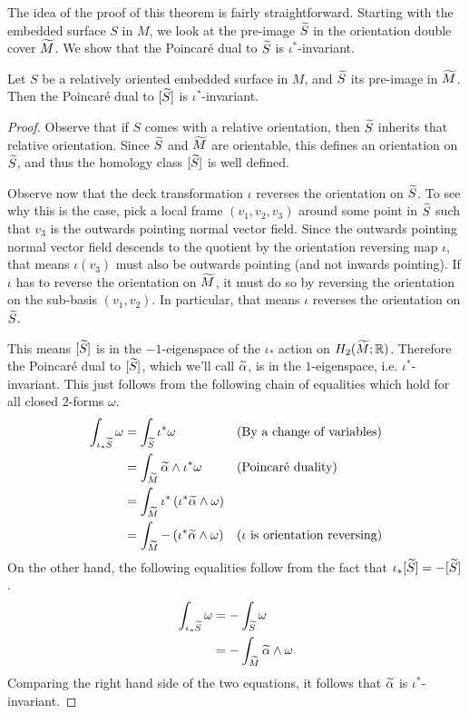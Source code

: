 The idea of the proof of this theorem is fairly straightforward. Starting with the embedded surface
$S$ in $M$, we look at the pre-image $\widetilde{S}$ in the orientation double cover $\widetilde{M}$. We show
that the Poincar\'e dual to $\widetilde{S}$ is $\iota^{\ast}$-invariant.
\begin{lem}
  \label{lem:PD1}
  Let $S$ be a relatively oriented embedded surface in $M$, and $\widetilde{S}$ its pre-image in
  $\widetilde{M}$. Then the Poincar\'e dual to $[\widetilde{S}]$ is $\iota^{\ast}$-invariant.
\end{lem}
\begin{proof}
  Observe that if $S$ comes with a relative orientation, then $\widetilde{S}$ inherits that relative
  orientation. Since $\widetilde{S}$ and $\widetilde{M}$ are orientable, this defines an orientation on $\widetilde{S}$,
  and thus the homology class $[\widetilde{S}]$ is well defined.

  Observe now that the deck transformation $\iota$ reverses the orientation on $\widetilde{S}$. To see why
  this is the case, pick a local frame $(v_1, v_2, v_3)$ around some point in $\widetilde{S}$ such that
  $v_3$ is the outwards pointing normal vector field. Since the outwards pointing normal vector
  field descends to the quotient by the orientation reversing map $\iota$, that means $\iota(v_3)$
  must also be outwards pointing (and not inwards pointing). If $\iota$ has to reverse the
  orientation on $\widetilde{M}$, it must do so by reversing the orientation on the sub-basis
  $(v_1, v_2)$. In particular, that means $\iota$ reverses the orientation on $\widetilde{S}$.

  This means $[\widetilde{S}]$ is in the $-1$-eigenspace of the $\iota_{\ast}$ action on
  $H_2(\widetilde{M}; \mathbb{R})$. Therefore the Poincar\'e dual to $[\widetilde{S}]$, which we'll call
  $\widetilde{\alpha}$, is in the $1$-eigenspace, i.e. $\iota^{\ast}$-invariant. This just follows from
  the following chain of equalities which hold for all closed $2$-forms $\omega$.
  \begin{align*}
    \int_{\iota_{\ast}\widetilde{S}} \omega &= \int_{\widetilde{S}} \iota^{\ast}\omega &&\text{(By a change of variables)} \\
                                     &= \int_{\widetilde{M}} \widetilde{\alpha} \wedge \iota^{\ast} \omega &&\text{(Poincar\'e duality)} \\
                                     &=\int_{\widetilde{M}} \iota^{\ast} \left( \iota^{\ast}\widetilde{\alpha} \wedge \omega \right) \\
    &= \int_{\widetilde{M}} - \left( \iota^{\ast} \widetilde{\alpha} \wedge \omega \right) &&\text{($\iota$ is orientation reversing)}
  \end{align*}
  On the other hand, the following equalities follow from the fact that
  $\iota_{\ast}[\widetilde{S}] = -[\widetilde{S}]$.
  \begin{align*}
    \int_{\iota_{\ast}\widetilde{S}} \omega &= - \int_{\widetilde{S}} \omega \\
                              &= - \int_{\widetilde{M}} \widetilde{\alpha} \wedge \omega
  \end{align*}
  Comparing the right hand side of the two equations, it follows that $\widetilde{\alpha}$ is
  $\iota^{\ast}$-invariant.
\end{proof}

